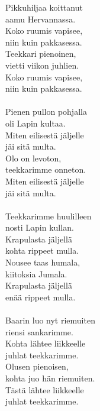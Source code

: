 
            Pikkuhiljaa koittanut \\
            aamu Hervannassa. \\
            Koko ruumis vapisee, \\
            niin kuin pakkasessa. \\
            Teekkari pienoinen, \\
            vietti viikon juhlien. \\
            Koko ruumis vapisee, \\
            niin kuin pakkasessa. \\
\hspace{10mm} \\
            Pienen pullon pohjalla \\
            oli Lapin kultaa. \\
            Miten eilisestä jäljelle \\
            jäi sitä multa. \\
            Olo on levoton, \\
            teekkarimme onneton. \\
            Miten eilisestä jäljelle \\
            jäi sitä multa. \\
\hspace{10mm} \\
            Teekkarimme huulilleen \\
            nosti Lapin kullan. \\
            Krapulasta jäljellä \\
            kohta rippeet mulla. \\
            Nousee taas humala, \\
            kiitoksia Jumala. \\
            Krapulasta jäljellä \\
            enää rippeet mulla. \\
\hspace{10mm} \\
            Baarin luo nyt riemuiten \\
            riensi sankarimme. \\
            Kohta lähtee liikkeelle \\
            juhlat teekkarimme. \\
            Olusen pienoisen, \\
            kohta juo hän riemuiten. \\
            Tästä lähtee liikkeelle \\
            juhlat teekkarimme. \\
